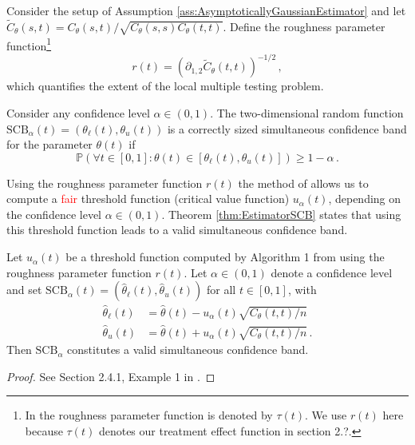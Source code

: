 \begin{definition}\label{def:RoughnessParameterFunctions}
    Consider the setup of Assumption \ref{ass:AsymptoticallyGaussianEstimator} and let
    $\tilde{C}_\theta(s, t) = {C_\theta(s, t)}/{\sqrt{C_\theta(s, s) C_\theta(t, t)}}$.
    Define the roughness parameter function\footnote{In  the roughness
    parameter function is denoted by $\tau(t)$. We use $r(t)$ here because $\tau(t)$
    denotes our treatment effect function in section 2.?.}
    \[
        r(t) = (\partial_{1,2}\tilde{C}_\theta(t, t))^{-1/2} \,,
    \]
    which quantifies the extent of the local multiple testing problem.
\end{definition}

\begin{definition}\label{def:SimultaneousConfidenceBand}
    Consider any confidence level $\alpha \in (0, 1)$. The two-dimensional random
    function $\text{SCB}_\alpha(t) = (\theta_\ell(t), \theta_u(t))$ is a correctly sized
    simultaneous confidence band for the parameter $\theta(t)$ if
    \[
        \mathbb{P}(\forall t \in [0, 1]: \theta(t) \in [\theta_\ell(t), \theta_u(t)])
        \geq 1 - \alpha \,.
    \]
\end{definition}

Using the roughness parameter function $r(t)$ the method of  allows us
to compute a \textcolor{red}{fair} threshold function (critical value function)
$u_\alpha(t)$, depending on the confidence level $\alpha \in (0, 1)$. Theorem
\ref{thm:EstimatorSCB} states that using this threshold function leads to a valid
simultaneous confidence band.

\begin{theorem}\label{thm:EstimatorSCB}
    Let $u_\alpha(t)$ be a threshold function computed by Algorithm 1 from
     using the roughness parameter function $r(t)$. Let $\alpha \in (0,
    1)$ denote a confidence level and set $\text{SCB}_\alpha(t) = (\hat{\theta}_\ell(t),
    \hat{\theta}_u(t))$ for all $t \in [0, 1]$, with
    \begin{align*}
        \hat{\theta}_\ell(t) &= \hat{\theta}(t) - u_\alpha(t) \sqrt{C_\theta(t, t) /
        n}\\
        \hat{\theta}_u(t) &= \hat{\theta}(t) + u_\alpha(t) \sqrt{C_\theta(t, t) / n} \,.
    \end{align*}
    Then $\text{SCB}_\alpha$ constitutes a valid simultaneous confidence band.
\end{theorem}
\begin{proof}
    See Section 2.4.1, Example 1 in .
\end{proof}


